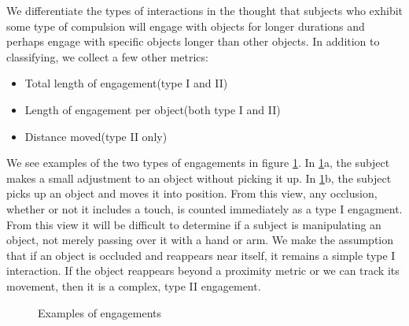\documentclass[11pt]{article}
\begin{document}
We differentiate the types of interactions in the thought that subjects who exhibit some type of compulsion will engage with objects for longer durations and perhaps engage with specific objects longer than other objects. In addition to classifying, we collect a few other metrics:
\begin{itemize}
\item Total length of engagement(type I and II)
\item Length of engagement per object(both type I and II)
\item Distance moved(type II only)
\end{itemize}
We see examples of the two types of engagements in figure \ref{engagement}. In \ref{engagement}a, the subject makes a small adjustment to an object without picking it up. In \ref{engagement}b, the subject picks up an object and moves it into position. From this view, any occlusion, whether or not it includes a touch, is counted immediately as a type I engagment. From this view it will be difficult to determine if a subject is manipulating an object, not merely passing over it with a hand or arm. We make the assumption that if an object is occluded and reappears near itself, it remains a simple type I interaction. If the object reappears beyond a proximity metric or we can track its movement, then it is a complex, type II engagement.
\begin{figure}%
    \centering
    \qquad
    \caption{Examples of engagements}%
    \label{engagement}%
\end{figure}
\end{document}
